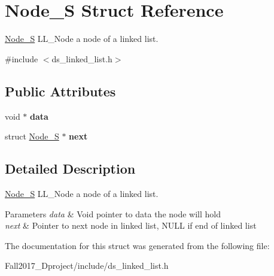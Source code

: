 \hypertarget{struct_node___s}{}\section{Node\+\_\+S Struct Reference}
\label{struct_node___s}


\hyperlink{struct_node___s}{Node\+\_\+S} L\+L\+\_\+\+Node a node of a linked list.  




{\ttfamily \#include $<$ds\+\_\+linked\+\_\+list.\+h$>$}

\subsection*{Public Attributes}
\begin{DoxyCompactItemize}
\item 
\mbox{\label{struct_node___s_a53622a590fc92ca3873fddd2a4f24d22}} 
void $\ast$ {\bfseries data}
\item 
\mbox{\label{struct_node___s_a127c1299dbb062f37ce6787ca5e07dd0}} 
struct \hyperlink{struct_node___s}{Node\+\_\+S} $\ast$ {\bfseries next}
\end{DoxyCompactItemize}


\subsection{Detailed Description}
\hyperlink{struct_node___s}{Node\+\_\+S} L\+L\+\_\+\+Node a node of a linked list. 


\begin{DoxyParams}{Parameters}
{\em data} & Void pointer to data the node will hold \\
\hline
{\em next} & Pointer to next node in linked list, N\+U\+LL if end of linked list \\
\hline
\end{DoxyParams}


The documentation for this struct was generated from the following file\+:\begin{DoxyCompactItemize}
\item 
Fall2017\+\_\+Dproject/include/ds\+\_\+linked\+\_\+list.\+h\end{DoxyCompactItemize}
